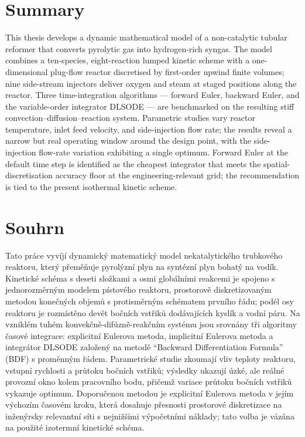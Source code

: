 
\chapter*{Summary}

This thesis develops a dynamic mathematical model of a non-catalytic tubular reformer that converts pyrolytic gas into hydrogen-rich syngas. The model combines a ten-species, eight-reaction lumped kinetic scheme with a one-dimensional plug-flow reactor discretised by first-order upwind finite volumes; nine side-stream injectors deliver oxygen and steam at staged positions along the reactor. Three time-integration algorithms --- forward Euler, backward Euler, and the variable-order integrator DLSODE --- are benchmarked on the resulting stiff convection--diffusion--reaction system. Parametric studies vary reactor temperature, inlet feed velocity, and side-injection flow rate; the results reveal a narrow but real operating window around the design point, with the side-injection flow-rate variation exhibiting a single optimum. Forward Euler at the default time step is identified as the cheapest integrator that meets the spatial-discretisation accuracy floor at the engineering-relevant grid; the recommendation is tied to the present isothermal kinetic scheme.


\chapter*{Souhrn}

Tato práce vyvíjí dynamický matematický model nekatalytického trubkového reaktoru, který přeměňuje pyrolýzní plyn na syntézní plyn bohatý na vodík. Kinetické schéma s deseti složkami a osmi globálními reakcemi je spojeno s jednorozměrným modelem pístového reaktoru, prostorově diskretizovaným metodou konečných objemů s protisměrným schématem prvního řádu; podél osy reaktoru je rozmístěno devět bočních vstřiků dodávajících kyslík a vodní páru. Na vzniklém tuhém konvekčně-difúzně-reakčním systému jsou srovnány tři algoritmy časové integrace: explicitní Eulerova metoda, implicitní Eulerova metoda a integrátor DLSODE založený na metodě ``Backward Differentiation Formula'' (BDF) s proměnným řádem. Parametrické studie zkoumají vliv teploty reaktoru, vstupní rychlosti a průtoku bočních vstřiků; výsledky ukazují úzké, ale reálné provozní okno kolem pracovního bodu, přičemž variace průtoku bočních vstřiků vykazuje optimum. Doporučenou metodou je explicitní Eulerova metoda v jejím výchozím časovém kroku, která dosahuje přesnosti prostorové diskretizace na inženýrsky relevantní síti s nejnižšími výpočetními náklady; tato volba je vázána na použité izotermní kinetické schéma.

